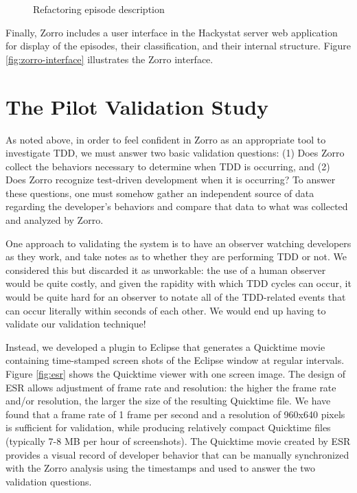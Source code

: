 \documentclass[runningheads]{llncs}
\begin{document}
\begin{figure}[ht] 
  \centering
  \caption{Refactoring episode description}
  \label{fig:Refactoring-Microprocess}
\end{figure} 

Finally, Zorro includes a user interface in the Hackystat server web
application for display of the episodes, their classification, and their
internal structure.  Figure \ref{fig:zorro-interface} illustrates the
Zorro interface. 

\begin{figure*}[ht] 
  \centering
  \caption{Zorro interface}
  \label{fig:zorro-interface}
\end{figure*} 


\section{The Pilot Validation Study}
\label{sec:casestudy}

As noted above, in order to feel confident in Zorro as an appropriate tool
to investigate TDD, we must answer two basic validation questions: (1) Does
Zorro collect the behaviors necessary to determine when TDD is occurring,
and (2) Does Zorro recognize test-driven development when it is occurring?
To answer these questions, one must somehow gather an independent source of
data regarding the developer's behaviors and compare that data to what was
collected and analyzed by Zorro.

One approach to validating the system is to have an observer watching
developers as they work, and take notes as to whether they are performing
TDD or not.  We considered this but discarded it as unworkable: the use of
a human observer would be quite costly, and given the rapidity with which
TDD cycles can occur, it would be quite hard for an observer to notate all
of the TDD-related events that can occur literally within seconds of each
other. We would end up having to validate our validation technique!

Instead, we developed a plugin to Eclipse that generates a Quicktime movie
containing time-stamped screen shots of the Eclipse window at regular
intervals.  Figure \ref{fig:esr} shows the Quicktime viewer with one screen
image.  The design of ESR allows adjustment of frame rate and resolution:
the higher the frame rate and/or resolution, the larger the size of the
resulting Quicktime file. We have found that a frame rate of 1 frame per
second and a resolution of 960x640 pixels is sufficient for validation,
while producing relatively compact Quicktime files (typically 7-8 MB per
hour of screenshots).  The Quicktime movie created by ESR provides a visual
record of developer behavior that can be manually synchronized with the
Zorro analysis using the timestamps and used to answer the two validation
questions.
\end{document}
